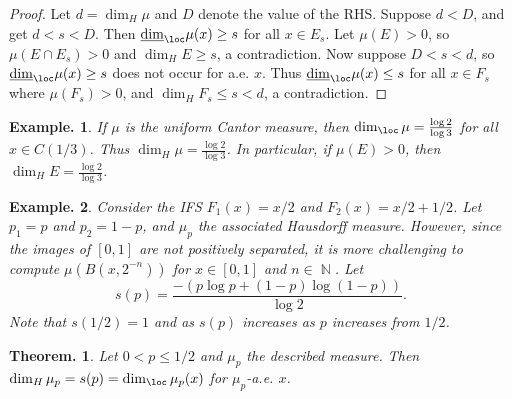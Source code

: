\documentclass[11pt, a4paper]{memoir}
\DeclareMathOperator{\N}{{\mathbb{N}}}
\theoremstyle{change}
\newtheorem{theorem}{Theorem.}[section]
\theoremstyle{plain}
\theoremstyle{nonumberplain}
\newtheorem{example}{Example.}
\newtheorem{proof}{Proof}
\numberwithin{equation}{section}
\begin{document}
\begin{proof}
    Let $d=\dim_H\mu$ and $D$ denote the value of the RHS.
    Suppose $d<D$, and get $d<s<D$.
    Then $\underline{\dim}_{\loc}\mu(x)\geq s$ for all $x\in E_s$.
    Let $\mu(E)>0$, so $\mu(E\cap E_s)>0$ and $\dim_H E\geq s$, a contradiction.
    Now suppose $D<s<d$, so $\underline{\dim}_{\loc}\mu(x)\geq s$ does not occur for a.e. $x$.
    Thus $\underline{\dim}_{\loc}\mu(x)\leq s$ for all $x\in F_s$ where $\mu(F_s)>0$, and $\dim_H F_s\leq s<d$, a contradiction.
\end{proof}
\begin{example}
    If $\mu$ is the uniform Cantor measure, then $\dim_{\loc}\mu = \frac{\log 2}{\log 3}$ for all $x\in C(1/3)$.
    Thus $\dim_H\mu=\frac{\log 2}{\log 3}$.
    In particular, if $\mu(E)>0$, then $\dim_H E=\frac{\log 2}{\log 3}$.
\end{example}
\begin{example}
    Consider the IFS $F_1(x)=x/2$ and $F_2(x)=x/2+1/2$.
    Let $p_1=p$ and $p_2=1-p$, and $\mu_p$ the associated Hausdorff measure.
    However, since the images of $[0,1]$ are not positively separated, it is more challenging to compute $\mu(B(x,2^{-n}))$ for $x\in[0,1]$ and $n\in\N$.
    Let
    \begin{equation*}
        s(p) = \frac{-(p\log p+(1-p)\log(1-p))}{\log 2}.
    \end{equation*}
    Note that $s(1/2)=1$ and as $s(p)$ increases as $p$ increases from $1/2$.
\end{example}
\begin{theorem}
    Let $0<p\leq 1/2$ and $\mu_p$ the described measure.
    Then $\dim_H\mu_p=s(p)=\dim_{\loc}\mu_p(x)$ for $\mu_p$-a.e. $x$.
\end{theorem}
\end{document}
